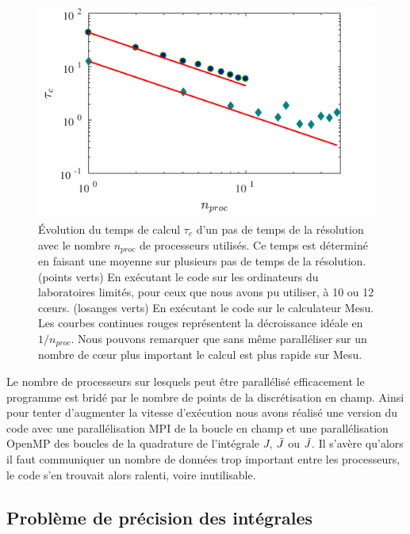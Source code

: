 \documentclass[10.5pt]{article}
\begin{document}
\begin{multicols}{2}
\begin{figure}[H]
\begin{center}
	\includegraphics[width=0.95\columnwidth]{Scalabilite.pdf}
\end{center}
\caption{Évolution du temps de calcul $\tau_c$ d'un pas de temps de la résolution avec le nombre $n_{proc}$ de processeurs utilisés. Ce temps est déterminé en faisant une moyenne sur  plusieurs pas de temps de la résolution. (points verts) En exécutant le code sur les ordinateurs du laboratoires limités, pour ceux que nous avons pu utiliser, à 10 ou 12 cœurs. (losanges verts) En exécutant le code sur le calculateur Mesu. Les courbes continues rouges représentent la décroissance idéale en $1/n_{proc}$. Nous pouvons remarquer que sans même paralléliser sur un nombre de cœur plus important le calcul est plus rapide sur Mesu.}
\label{fig:timeScal}
\end{figure}


Le nombre de processeurs sur lesquels peut être parallélisé efficacement le programme est bridé par le nombre de points de la discrétisation en champ. Ainsi pour tenter d'augmenter la vitesse d'exécution nous avons réalisé une version du code avec une parallélisation MPI \cite{open2012open} de la boucle en champ et une parallélisation OpenMP des boucles de la quadrature de l'intégrale $J$, $\bar{J}$ ou $\tilde{J}$. Il s'avère qu'alors il faut communiquer un nombre de données trop important entre les processeurs, le code s'en trouvait alors ralenti, voire inutilisable. \\







\subsection{Problème de précision des intégrales}



\end{multicols}
\end{document}
